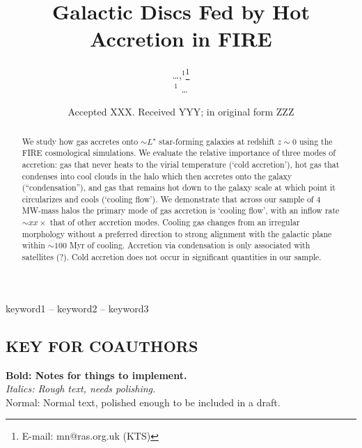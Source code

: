 \documentclass[fleqn,usenatbib]{mnras}
\title[Hot Accretion in FIRE]{Galactic Discs Fed by Hot Accretion in FIRE}
\author[\ldots]{
\ldots,$^{1}$\thanks{E-mail: mn@ras.org.uk (KTS)}
\\
$^1$ \ldots
}
\date{Accepted XXX. Received YYY; in original form ZZZ}
\begin{document}
\label{firstpage}
\pagerange{\pageref{firstpage}--\pageref{lastpage}}
\maketitle

\begin{abstract}

We study how gas accretes onto $\sim L^\star$ star-forming galaxies at redshift $z\sim0$ using the FIRE cosmological simulations. We evaluate the relative importance of three modes of accretion: gas that never heats to the virial temperature (`cold accretion'), hot gas that condenses into cool clouds in the halo which then accretes onto the galaxy (``condensation''), and gas that remains hot down to the galaxy scale at which point it circularizes and cools (`cooling flow'). 
We demonstrate that across our sample of 4 MW-mass halos the primary mode of gas accretion is `cooling flow', with an inflow rate $\sim xx\times$ that of other accretion modes. Cooling gas changes from an irregular morphology without a preferred direction to strong alignment with the galactic plane within $\sim 100$ Myr of cooling.
Accretion via condensation is only associated with satellites (?). Cold accretion does not occur in significant quantities in our sample. 
\end{abstract}

\begin{keywords}
keyword1 -- keyword2 -- keyword3
\end{keywords}



\subsection{ KEY FOR COAUTHORS}
\textbf{Bold: Notes for things to implement.} \\
\textit{Italics: Rough text, needs polishing.} \\
Normal: Normal text, polished enough to be included in a draft.
\end{document}
